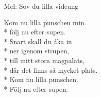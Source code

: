 \begin{SongText}
    \begin{SongInfo}
        Mel: Sov du lilla videung
    \end{SongInfo}
    \begin{SongVerse}
        Kom nu lilla punschen min.\\*%
        följ nu efter supen.\\*%
        Snart skall du åka in\\*%
        ner igenom strupen,\\*%
        till mitt stora magpalats,\\*%
        där det finns så mycket plats.\\*%
        Kom nu lilla punschen.\\*%
        Följ nu efter supen.
    \end{SongVerse}\end{SongText}
